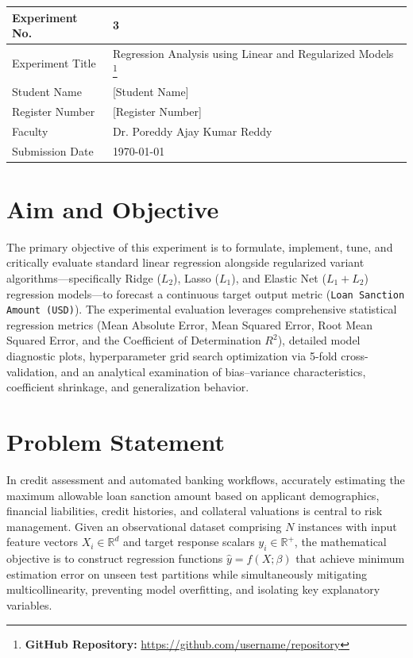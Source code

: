 \documentclass[12pt,a4paper]{article}
\begin{document}
\begin{tabular}{|p{4cm}|p{11cm}|}
\hline
Experiment No. & 3 \\ \hline
Experiment Title & Regression Analysis using Linear and Regularized Models
\footnote{\textbf{GitHub Repository: }\url{https://github.com/username/repository}}\\ \hline
Student Name & [Student Name] \\ \hline
Register Number & [Register Number] \\ \hline
Faculty & Dr. Poreddy Ajay Kumar Reddy \\ \hline
Submission Date & \today \\ \hline
\end{tabular}

\vspace{0.3cm}

\section{Aim and Objective}
The primary objective of this experiment is to formulate, implement, tune, and critically evaluate standard linear regression alongside regularized variant algorithms—specifically Ridge ($L_2$), Lasso ($L_1$), and Elastic Net ($L_1 + L_2$) regression models—to forecast a continuous target output metric (\texttt{Loan Sanction Amount (USD)}). The experimental evaluation leverages comprehensive statistical regression metrics (Mean Absolute Error, Mean Squared Error, Root Mean Squared Error, and the Coefficient of Determination $R^2$), detailed model diagnostic plots, hyperparameter grid search optimization via 5-fold cross-validation, and an analytical examination of bias--variance characteristics, coefficient shrinkage, and generalization behavior.

\section{Problem Statement}
In credit assessment and automated banking workflows, accurately estimating the maximum allowable loan sanction amount based on applicant demographics, financial liabilities, credit histories, and collateral valuations is central to risk management. Given an observational dataset comprising $N$ instances with input feature vectors $X_i \in \mathbb{R}^d$ and target response scalars $y_i \in \mathbb{R}^+$, the mathematical objective is to construct regression functions $\hat{y} = f(X; \beta)$ that achieve minimum estimation error on unseen test partitions while simultaneously mitigating multicollinearity, preventing model overfitting, and isolating key explanatory variables.
\end{document}

